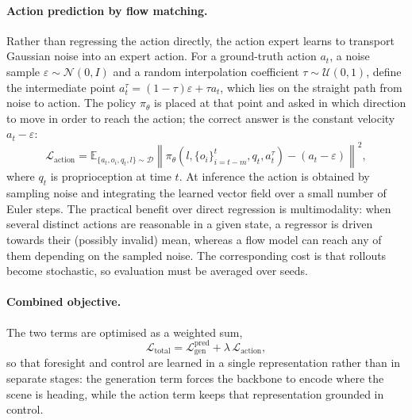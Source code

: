 \paragraph{Action prediction by flow matching.}
Rather than regressing the action directly, the action expert learns to
transport Gaussian noise into an expert action. For a ground-truth action $a_t$,
a noise sample $\varepsilon\sim\mathcal{N}(0,I)$ and a random interpolation
coefficient $\tau\sim\mathcal{U}(0,1)$, define the intermediate point
$a_t^{\tau} = (1-\tau)\varepsilon + \tau a_t$, which lies on the straight path
from noise to action. The policy $\pi_\theta$ is placed at that point and asked
in which direction to move in order to reach the action; the correct answer is
the constant velocity $a_t - \varepsilon$:
\begin{equation}
    \mathcal{L}_{\mathrm{action}}
    = \mathbb{E}_{\{a_t,o_i,q_t,l\}\sim\mathcal{D}}
      \left\|\pi_\theta\!\left(l, \{o_i\}_{i=t-m}^{t}, q_t, a_t^{\tau}\right)
      - (a_t - \varepsilon)\right\|^2 ,
    \label{eq:action}
\end{equation}
where $q_t$ is proprioception at time $t$. At inference the action is obtained
by sampling noise and integrating the learned vector field over a small number
of Euler steps. The practical benefit over direct regression is multimodality:
when several distinct actions are reasonable in a given state, a regressor is
driven towards their (possibly invalid) mean, whereas a flow model can reach any
of them depending on the sampled noise. The corresponding cost is that rollouts
become stochastic, so evaluation must be averaged over seeds.

\paragraph{Combined objective.}
The two terms are optimised as a weighted sum,
\begin{equation}
    \mathcal{L}_{\mathrm{total}}
    = \mathcal{L}^{\mathrm{pred}}_{\mathrm{gen}}
      + \lambda \, \mathcal{L}_{\mathrm{action}},
    \label{eq:total}
\end{equation}
so that foresight and control are learned in a single representation rather than
in separate stages: the generation term forces the backbone to encode where the
scene is heading, while the action term keeps that representation grounded in
control.

